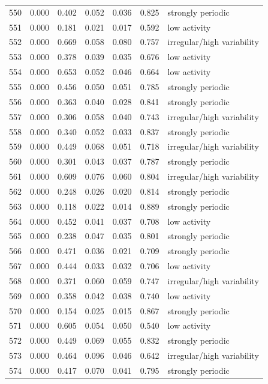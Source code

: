 \begin{longtable}{lrrrrrl}
550 & 0.000 & 0.402 & 0.052 & 0.036 & 0.825 & strongly periodic \\
551 & 0.000 & 0.181 & 0.021 & 0.017 & 0.592 & low activity \\
552 & 0.000 & 0.669 & 0.058 & 0.080 & 0.757 & irregular/high variability \\
553 & 0.000 & 0.378 & 0.039 & 0.035 & 0.676 & low activity \\
554 & 0.000 & 0.653 & 0.052 & 0.046 & 0.664 & low activity \\
555 & 0.000 & 0.456 & 0.050 & 0.051 & 0.785 & strongly periodic \\
556 & 0.000 & 0.363 & 0.040 & 0.028 & 0.841 & strongly periodic \\
557 & 0.000 & 0.306 & 0.058 & 0.040 & 0.743 & irregular/high variability \\
558 & 0.000 & 0.340 & 0.052 & 0.033 & 0.837 & strongly periodic \\
559 & 0.000 & 0.449 & 0.068 & 0.051 & 0.718 & irregular/high variability \\
560 & 0.000 & 0.301 & 0.043 & 0.037 & 0.787 & strongly periodic \\
561 & 0.000 & 0.609 & 0.076 & 0.060 & 0.804 & irregular/high variability \\
562 & 0.000 & 0.248 & 0.026 & 0.020 & 0.814 & strongly periodic \\
563 & 0.000 & 0.118 & 0.022 & 0.014 & 0.889 & strongly periodic \\
564 & 0.000 & 0.452 & 0.041 & 0.037 & 0.708 & low activity \\
565 & 0.000 & 0.238 & 0.047 & 0.035 & 0.801 & strongly periodic \\
566 & 0.000 & 0.471 & 0.036 & 0.021 & 0.709 & strongly periodic \\
567 & 0.000 & 0.444 & 0.033 & 0.032 & 0.706 & low activity \\
568 & 0.000 & 0.371 & 0.060 & 0.059 & 0.747 & irregular/high variability \\
569 & 0.000 & 0.358 & 0.042 & 0.038 & 0.740 & low activity \\
570 & 0.000 & 0.154 & 0.025 & 0.015 & 0.867 & strongly periodic \\
571 & 0.000 & 0.605 & 0.054 & 0.050 & 0.540 & low activity \\
572 & 0.000 & 0.449 & 0.069 & 0.055 & 0.832 & strongly periodic \\
573 & 0.000 & 0.464 & 0.096 & 0.046 & 0.642 & irregular/high variability \\
574 & 0.000 & 0.417 & 0.070 & 0.041 & 0.795 & strongly periodic \\

\end{longtable}
